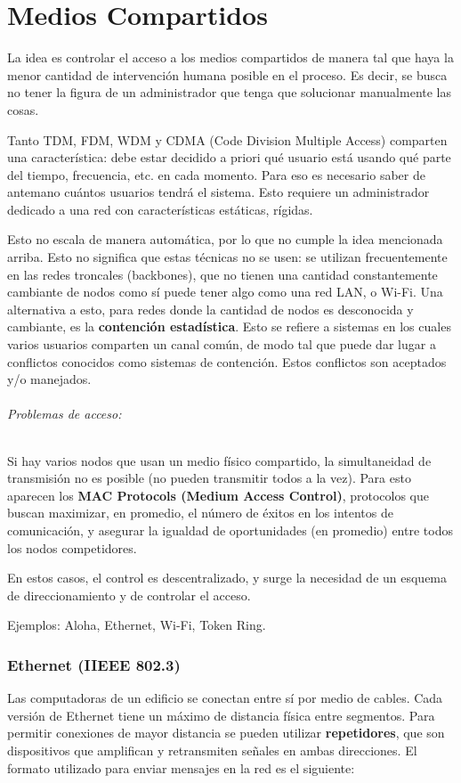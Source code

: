 \part{Medios Compartidos}
La idea es controlar el acceso a los medios compartidos de manera tal que haya la menor cantidad de intervención humana posible en el proceso. Es decir, se busca no tener la figura de un administrador que tenga que solucionar manualmente las cosas.

Tanto TDM, FDM, WDM y CDMA (Code Division Multiple Access) comparten una característica: debe estar decidido a priori qué usuario está usando qué parte del tiempo, frecuencia, etc. en cada momento. Para eso es necesario saber de antemano cuántos usuarios tendrá el sistema. Esto requiere un administrador dedicado a una red con características estáticas, rígidas.

Esto no escala de manera automática, por lo que no cumple la idea mencionada arriba. Esto no significa que estas técnicas no se usen: se utilizan frecuentemente en las redes
troncales (backbones), que no tienen una cantidad constantemente cambiante de nodos como sí puede tener algo como una red LAN, o Wi-Fi. Una alternativa a esto, para redes donde la cantidad de nodos es desconocida y cambiante, es la \textbf{contención estadística}. Esto se refiere a sistemas en los cuales varios usuarios comparten un canal común, de modo tal que puede dar lugar a conflictos conocidos como sistemas de
contención. Estos conflictos son aceptados y/o manejados.

\paragraph{Problemas de acceso:} Si hay varios nodos que usan un medio físico compartido, la simultaneidad de transmisión no es posible (no pueden transmitir todos a la vez). Para esto aparecen los \textbf{MAC Protocols (Medium Access Control)}, protocolos que buscan maximizar, en promedio, el número de éxitos en los intentos de comunicación, y asegurar la igualdad de oportunidades (en promedio) entre todos los nodos competidores.

En estos casos, el control es descentralizado, y surge la necesidad de un esquema de direccionamiento y de controlar el acceso.

Ejemplos: Aloha, Ethernet, Wi-Fi, Token Ring.

\section{Ethernet (IIEEE 802.3)}
Las computadoras de un edificio se conectan entre sí por medio de cables. Cada versión de Ethernet tiene un máximo de distancia física entre segmentos. Para permitir conexiones de mayor distancia se pueden utilizar \textbf{repetidores}, que son dispositivos que amplifican y retransmiten señales en ambas direcciones.
El formato utilizado para enviar mensajes en la red es el siguiente:

